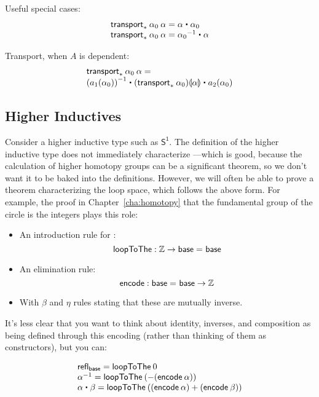 Useful special cases:
\[
\begin{array}{l}
\transport{x:A \mapsto \id[A] {a}{x}} {\alpha_0} \: {\alpha} = \alpha \ct \alpha_0 \\
\transport{x:A \mapsto \id[A] {x_0}{a}} {\alpha_0} \: {\alpha} = \opp {\alpha_0} \ct \alpha \\
\end{array}
\]

Transport, when $A$ is dependent:
\[
\begin{array}{l}
\transport{x_0:A_0 \mapsto \id[A(x_0)] {a_1(x_0)}{a_2(x_0)}} {\alpha_0} \: {\alpha} = \\
\opp{(\map{a_1}{\alpha_0})} \ct \mapdep{(\transport{A}{\alpha_0})}{\alpha} \ct \map{a_2}{\alpha_0}
\end{array}
\]

\subsection{Higher Inductives}

\newcommand{\sone}{\mathsf{S^1}}

Consider a higher inductive type such as $\sone$.  The definition of the
higher inductive type does not immediately characterize
\id[\sone]{x}{y}---which is good, because the calculation of higher
homotopy groups can be a significant theorem, so we don't want it to be
baked into the definitions.  However, we will often be able to prove a
theorem characterizing the loop space, which follows the above form.
For example, the proof in Chapter~\ref{cha:homotopy} that the fundamental
group of the circle is the integers plays this role:

\begin{itemize}
\item An introduction rule for \id[\sone]{\mathsf{base}}{\mathsf{base}}:
  \[
  \mathsf{loopToThe} : \mathbb{Z} \to \mathsf{base} =_{} \mathsf{base}
  \]
\item An elimination rule:
  \[
  \mathsf{encode} : \mathsf{base} =_{} \mathsf{base} \to \mathbb{Z}
  \]
\item With $\beta$ and $\eta$ rules stating that these are mutually inverse.
\end{itemize}

It's less clear that you want to think about identity, inverses, and
composition as being defined through this encoding (rather than thinking
of them as constructors), but you can:

\[
\begin{array}{l}
\refl{\mathsf{base}} = \mathsf{loopToThe} \: 0 \\
\opp{\alpha} = \mathsf{loopToThe} \: (- (\mathsf{encode} \: \alpha)) \\
\alpha \ct \beta = \mathsf{loopToThe} \: ((\mathsf{encode} \: \alpha) + (\mathsf{encode} \: \beta)) \\
\end{array}
\]

